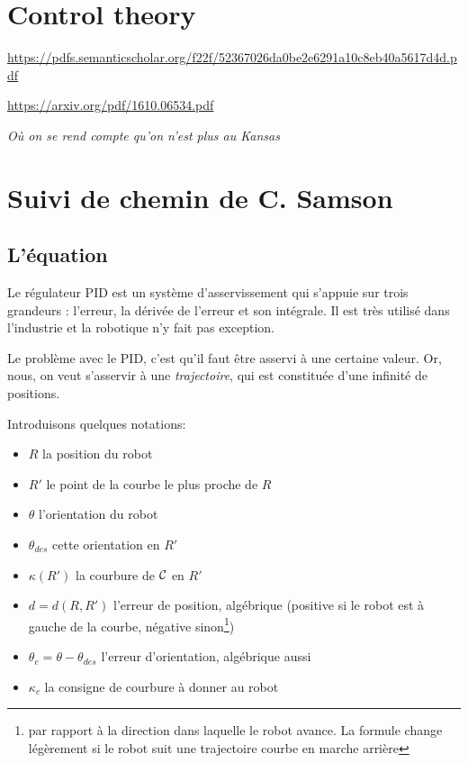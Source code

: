 \documentclass[11pt]{article}
\begin{document}
    \section{Control theory}\label{sec:controlTheory}

    \href{https://pdfs.semanticscholar.org/f22f/52367026da0be2e6291a10c8eb40a5617d4d.pdf}{https://pdfs.semanticscholar.org/f22f/52367026da0be2e6291a10c8eb40a5617d4d.pdf}

    \href{https://arxiv.org/pdf/1610.06534.pdf}{https://arxiv.org/pdf/1610.06534.pdf}





    \hfill \textit{Où on se rend compte qu'on n'est plus au Kansas}

    \section{Suivi de chemin de C. Samson}\label{sec:suiviDeCheminDeC.Samson}

    \subsection{L'équation}

    Le régulateur PID est un système d'asservissement qui s'appuie sur trois grandeurs : l'erreur, la dérivée de l'erreur et son intégrale. Il est très utilisé dans l'industrie et la robotique n'y fait pas exception.

    Le problème avec le PID, c'est qu'il faut être asservi à une certaine valeur. Or, nous, on veut s'asservir à une \emph{trajectoire}, qui est constituée d'une infinité de positions\up{\textcolor{blue}{[réf. nécessaire]}}.


    Introduisons quelques notations:
    \begin{itemize}
        \item $R$ la position du robot
        \item $R'$ le point de la courbe le plus proche de $R$
        \item $\theta$ l'orientation du robot
        \item $\theta_{des}$ cette orientation en $R'$
        \item $\kappa(R')$ la courbure de $\cal C$ en $R'$
        \item $d = d(R, R')$ l'erreur de position, algébrique (positive si le robot est à gauche de la courbe, négative sinon\footnote{par rapport à la direction dans laquelle le robot avance. La formule change légèrement si le robot suit une trajectoire courbe en marche arrière})
        \item $\theta_e = \theta - \theta_{des}$ l'erreur d'orientation, algébrique aussi
        \item $\kappa_c$ la consigne de courbure à donner au robot
    \end{itemize}
\end{document}

